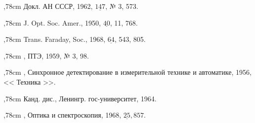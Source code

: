 \noindent{},78cm
 Докл. АН СССР,
1962, $\underline{147}$, № 3, 573.


\noindent{},78cm
 J. Opt. Soc. Amer., 1950,
$\underline{40}$, 11, 768.


\noindent{},78cm
 Trans. Faraday, Soc., 1968,
$\underline{64}$, 543, 805.


\noindent{},78cm
, ПТЭ, 1959, № 3, 98.


\noindent{},78cm
, Синхронное детектирование в
измерительной технике и автоматике, 1956, << Техника >>.


\noindent{},78cm
 Канд. дис., Ленингр.
гос-университет, 1964.


\noindent{},78cm
, Оптика и спектроскопия, 1968,
$\underline{25}, 857.$

